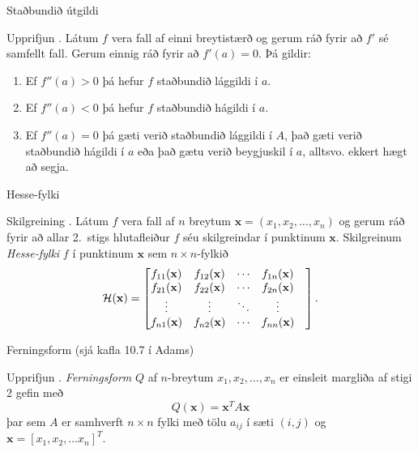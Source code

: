 \begin{frame}{Staðbundið útgildi} 

\begin {block}{Upprifjun \kaflanr.}
 Látum $f$ vera fall af einni breytistærð og
gerum ráð fyrir að $f'$ sé samfellt fall.  Gerum einnig ráð fyrir að
$f'(a)=0$.  Þá gildir: 

\begin {enumerate}
 \item Ef $f''(a)>0$ þá hefur $f$ staðbundið lággildi í $a$.
 \item  Ef $f''(a)<0$ þá hefur $f$ staðbundið hágildi í $a$.
 \item  Ef $f''(a)=0$ þá gæti verið staðbundið lággildi í $A$, það gæti
     verið staðbundið hágildi í $a$ eða það gætu verið beygjuskil í
     $a$, alltsvo. ekkert hægt að segja. 
 \end {enumerate}

\end{block}

\end{frame}


\begin{frame}{Hesse-fylki} 

\begin {block}{Skilgreining \kaflanr.}
Látum $f$ vera fall af $n$ breytum $\mathbf{x} = (x_1,x_2,\ldots,x_n)$ og
gerum ráð fyrir að allar 2.~stigs hlutafleiður $f$ séu skilgreindar í
punktinum $\mathbf{x}$.  Skilgreinum  {\em \color{red} Hesse-fylki} $f$ í punktinum
$\mathbf{x}$ sem $n\times n$-fylkið
$${\cal H}(\mathbf{x})=\begin{bmatrix} f_{11}(\mathbf{x})&f_{12}(\mathbf{x}) & \cdots & f_{1n}(\mathbf{x})\\
 f_{21}(\mathbf{x})&f_{22}(\mathbf{x}) & \cdots & f_{2n}(\mathbf{x}) \\
 \vdots & \vdots & \ddots & \vdots & \\
  f_{n1}(\mathbf{x})&f_{n2}(\mathbf{x}) & \cdots & f_{nn}(\mathbf{x})\end{bmatrix}.$$
\end{block}

\end{frame}


\begin{frame}{Ferningsform (sjá kafla 10.7 í Adams)} 

\begin {block}{Upprifjun \kaflanr.}
{\em \color{red} Ferningsform} $Q$ af $n$-breytum $x_1,x_2,\ldots, x_n$ er einsleit margliða af stigi 2 gefin með 
\begin {equation*}
Q(\mathbf{x}) = \mathbf{x}^T A \mathbf{x}
\end {equation*}
þar sem $A$ er samhverft $n \times n$ fylki með tölu $a_{ij}$ í sæti $(i,j)$ og $\mathbf{x} = [x_1,x_2,\ldots x_n]^T$.
\end{block}

\end{frame}




